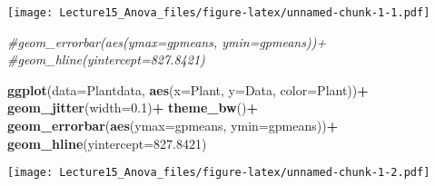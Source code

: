 \documentclass[]{article}
\newenvironment{Shaded}{\begin{snugshade}}{\end{snugshade}}
\newcommand{\KeywordTok}[1]{\textcolor[rgb]{0.13,0.29,0.53}{\textbf{#1}}}
\newcommand{\DataTypeTok}[1]{\textcolor[rgb]{0.13,0.29,0.53}{#1}}
\newcommand{\FloatTok}[1]{\textcolor[rgb]{0.00,0.00,0.81}{#1}}
\newcommand{\StringTok}[1]{\textcolor[rgb]{0.31,0.60,0.02}{#1}}
\newcommand{\CommentTok}[1]{\textcolor[rgb]{0.56,0.35,0.01}{\textit{#1}}}
\newcommand{\OperatorTok}[1]{\textcolor[rgb]{0.81,0.36,0.00}{\textbf{#1}}}
\newcommand{\NormalTok}[1]{#1}
\begin{document}
\texttt{[image: Lecture15\_Anova\_files/figure-latex/unnamed-chunk-1-1.pdf]}

\begin{Shaded}
\begin{Highlighting}[]
  \CommentTok{#geom_errorbar(aes(ymax=gpmeans, ymin=gpmeans))+}
  \CommentTok{#geom_hline(yintercept=827.8421)}

\KeywordTok{ggplot}\NormalTok{(}\DataTypeTok{data=}\NormalTok{Plantdata, }\KeywordTok{aes}\NormalTok{(}\DataTypeTok{x=}\NormalTok{Plant, }\DataTypeTok{y=}\NormalTok{Data, }\DataTypeTok{color=}\NormalTok{Plant))}\OperatorTok{+}
\StringTok{  }\KeywordTok{geom_jitter}\NormalTok{(}\DataTypeTok{width=}\FloatTok{0.1}\NormalTok{)}\OperatorTok{+}
\StringTok{  }\KeywordTok{theme_bw}\NormalTok{()}\OperatorTok{+}
\StringTok{  }\KeywordTok{geom_errorbar}\NormalTok{(}\KeywordTok{aes}\NormalTok{(}\DataTypeTok{ymax=}\NormalTok{gpmeans, }\DataTypeTok{ymin=}\NormalTok{gpmeans))}\OperatorTok{+}
\StringTok{  }\KeywordTok{geom_hline}\NormalTok{(}\DataTypeTok{yintercept=}\FloatTok{827.8421}\NormalTok{)}
\end{Highlighting}
\end{Shaded}

\texttt{[image: Lecture15\_Anova\_files/figure-latex/unnamed-chunk-1-2.pdf]}
\end{document}

